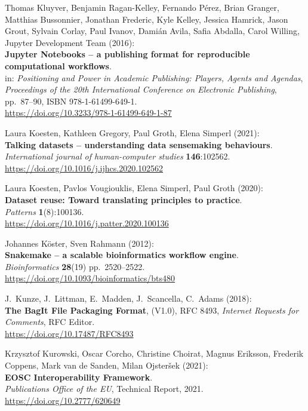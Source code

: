\begin{thebibliography}{9}
Thomas Kluyver, Benjamin Ragan-Kelley, Fernando Pérez, Brian
Granger, Matthias Bussonnier, Jonathan Frederic, Kyle Kelley, Jessica
Hamrick, Jason Grout, Sylvain Corlay, Paul Ivanov, Damián Avila, Safia
Abdalla, Carol Willing, Jupyter Development Team (2016):\\
\textbf{Jupyter Notebooks -- a publishing format for reproducible
computational workflows}.\\
in: \emph{Positioning and Power in Academic Publishing: Players, Agents
and Agendas},\\
\emph{Proceedings of the 20th International Conference on Electronic
Publishing}, pp.~87--90, ISBN 978-1-61499-649-1.\\
\url{https://doi.org/10.3233/978-1-61499-649-1-87}

Laura Koesten, Kathleen Gregory, Paul Groth, Elena Simperl
(2021):\\
\textbf{Talking datasets -- understanding data sensemaking
behaviours}.\\
\emph{International journal of human-computer studies}
\textbf{146}:102562.\\
\url{https://doi.org/10.1016/j.ijhcs.2020.102562}

Laura Koesten, Pavlos Vougiouklis, Elena Simperl, Paul Groth
(2020):\\
\textbf{Dataset reuse: Toward translating principles to practice}.\\
\emph{Patterns} \textbf{1}(8):100136.\\
\url{https://doi.org/10.1016/j.patter.2020.100136}

Johannes Köster, Sven Rahmann (2012):\\
\textbf{Snakemake -- a scalable bioinformatics workflow engine}.\\
\emph{Bioinformatics} \textbf{28}(19) pp.~2520--2522.\\
\url{https://doi.org/10.1093/bioinformatics/bts480}

J.~Kunze, J.~Littman, E.~Madden, J.~Scancella, C.~Adams
(2018):\\
\textbf{The BagIt File Packaging Format}, (V1.0), RFC 8493,
\emph{Internet Requests for Comments}, RFC Editor.\\
\url{https://doi.org/10.17487/RFC8493}

Krzysztof Kurowski, Oscar Corcho, Christine Choirat, Magnus
Eriksson, Frederik Coppens, Mark van de Sanden, Milan Ojsteršek
(2021):\\
\textbf{EOSC Interoperability Framework}.\\
\emph{Publications Office of the EU}, Technical Report, 2021.\\
\url{https://doi.org/10.2777/620649}


\end{thebibliography}
